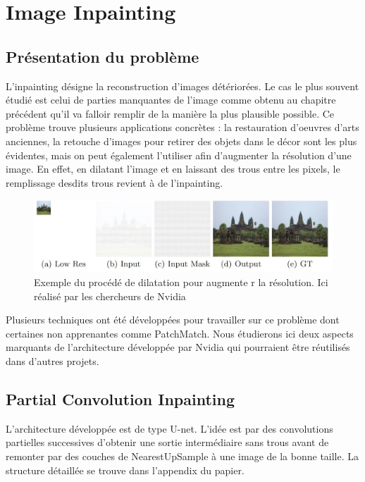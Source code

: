 \chapter{Image Inpainting}

\section{Présentation du problème}

L'inpainting désigne la reconstruction d'images détériorées. Le cas le plus souvent étudié est celui de parties manquantes de l'image comme obtenu au chapitre précédent qu'il va falloir remplir de la manière la plus plausible possible.
Ce problème trouve plusieurs applications concrètes : la restauration d'oeuvres d'arts anciennes, la retouche d'images pour retirer des objets dans le décor sont les plus évidentes, mais on peut également l'utiliser afin d'augmenter la résolution d'une image. En effet, en dilatant l'image et en laissant des trous entre les pixels, le remplissage desdits trous revient à de l'inpainting.

\begin{figure}[!h]
    \centering
    \includegraphics[width= 400pt,valign=t]{"images/Image_inpainting/resolution"}
    \caption{Exemple du procédé de dilatation pour augmente r la résolution. Ici réalisé par les chercheurs de Nvidia \cite{liu_image_2018}}
\end{figure}

Plusieurs techniques ont été développées pour travailler sur ce problème dont certaines non apprenantes comme PatchMatch. Nous étudierons ici deux aspects marquants de l'architecture développée par Nvidia qui pourraient être réutilisés dans d'autres projets.\\
\section{Partial Convolution Inpainting}
L'architecture développée est de type U-net. L'idée est par des convolutions partielles successives d'obtenir une sortie intermédiaire sans trous avant de remonter par des couches de NearestUpSample à une image de la bonne taille. La structure détaillée se trouve dans l'appendix du papier. \cite{liu_image_2018}
